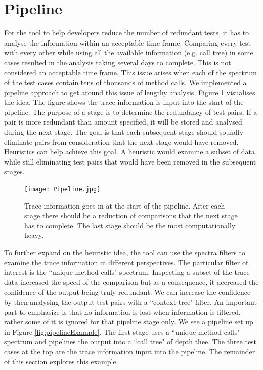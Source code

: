 \section{Pipeline }
\label{pipelinesection}
For the tool to help developers reduce the number of redundant tests, it has to analyse the information within an acceptable time frame. Comparing every test with every other while using all the available information (e.g. call tree) in some cases resulted in the analysis taking several days to complete. This is not considered an acceptable time frame. This issue arises when each of the spectrum of the test cases contain tens of thousands of method calls. We implemented a pipeline approach to get around this issue of lengthy analysis. Figure \ref{fig:pipeline} visualises the idea. The figure shows the trace information is input into the start of the pipeline. The purpose of a stage is to determine the redundancy of test pairs. If a pair is more redundant than amount specified, it will be stored and analysed during the next stage. The goal is that each subsequent stage should soundly eliminate pairs from consideration that the next stage would have removed. Heuristics can help achieve this goal. A heuristic would examine a subset of data while still eliminating test pairs that would have been removed in the subsequent stages. 

\begin{figure}[h]
\texttt{[image: Pipeline.jpg]}
\caption{Trace information goes in at the start of the pipeline. After each stage there should be a reduction of comparisons that the next stage has to complete. The last stage should be the most computationally heavy.}
\label{fig:pipeline}
\end{figure}

To further expand on the heuristic idea, the tool can use the spectra filters to examine the trace information in different perspectives. The particular filter of interest is the ``unique method calls" spectrum. Inspecting a subset of the trace data increased the speed of the comparison but as a consequence, it decreased the confidence of the output being truly redundant. We can increase the confidence by then analysing the output test pairs with a ``context tree" filter. An important part to emphasize is that no information is lost when information is filtered, rather some of it is ignored for that pipeline stage only. We see a pipeline set up in Figure \ref{fig:pipelineExample}. The first stage uses a ``unique method calls" spectrum and pipelines the output into a ``call tree" of depth thee. The three test cases at the top are the trace information input into the pipeline. The remainder of this section explores this example. 


